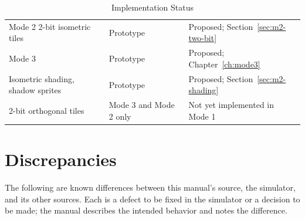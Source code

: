 \begin{table}[H]
\begin{tabular}{p{5.8cm}p{3.4cm}p{5.2cm}}
		Mode 2 2-bit isometric tiles                       & Prototype                                                    & Proposed; Section~\ref{sec:m2-two-bit}                                          \\
		Mode 3                                             & Prototype                                                    & Proposed; Chapter~\ref{ch:mode3}                                                \\
		Isometric shading, shadow sprites                  & Prototype                                                    & Proposed; Section~\ref{sec:m2-shading}                                          \\
		2-bit orthogonal tiles                             & Mode 3 and Mode 2 only                                       & Not yet implemented in Mode 1                                                   \\
		\bottomrule
	\end{tabular}
	\caption{Implementation Status}
	\label{tab:status}
\end{table}

\section{Discrepancies}
\label{sec:status-discrepancies}

The following are known differences between this manual's source, the simulator, and its other sources. Each is a
defect to be fixed in the simulator or a decision to be made; the manual describes the intended behavior and notes the
difference.

